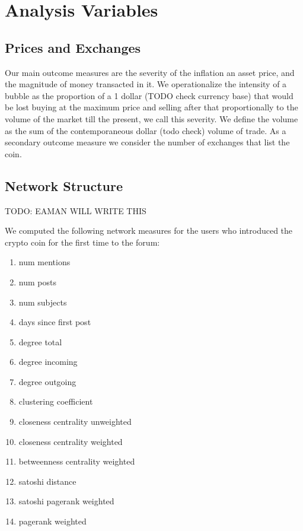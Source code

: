 
\section{Analysis Variables}
\subsection{Prices and Exchanges}
Our main outcome measures are the severity of the inflation an asset price, and the magnitude of money transacted in it.
We operationalize the intensity of a bubble as the proportion of a 1 dollar (TODO check currency base) that would be lost buying at the maximum price and selling after that proportionally to the volume of the market till the present, we call this severity.
We define the volume as the sum of the contemporaneous dollar (todo check) volume of trade.
As a secondary outcome measure we consider the number of exchanges that list the coin.


\subsection{Network Structure}
TODO: EAMAN WILL WRITE THIS


We computed the following network measures for the users who introduced the
crypto coin for the first time to the forum:
\begin{enumerate}
  \item{num mentions}
  \item{num posts}
  \item{num subjects}
  \item{days since first post}
  \item{degree total}
  \item{degree incoming}
  \item{degree outgoing}
  \item{clustering coefficient}
  \item{closeness centrality unweighted}
  \item{closeness centrality weighted}
  \item{betweenness centrality weighted}
  \item{satoshi distance}
  \item{satoshi pagerank weighted}
  \item{pagerank weighted}
\end{enumerate}

